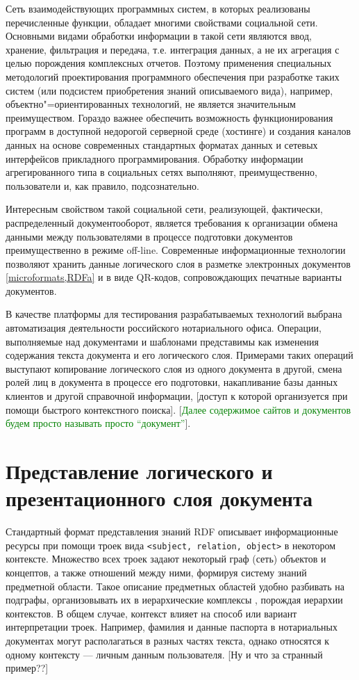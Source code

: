 \documentclass[utf8]{../IncArticle}
\newcommand{\e}[2][fcolor]{\textcolor{pcolor}{[}\textcolor{#1}{#2}\textcolor{pcolor}{]}}
\begin{document}
Сеть взаимодействующих программных систем, в которых реализованы
перечисленные функции, обладает многими свойствами социальной сети.
Основными видами обработки информации в такой сети являются ввод,
хранение, фильтрация и передача, т.е. интеграция данных, а не их
агрегация с целью порождения комплексных отчетов.  Поэтому применения
специальных методологий проектирования программного обеспечения при
разработке таких систем (или подсистем приобретения знаний
описываемого вида), например, объектно"=ориентированных технологий, не
является значительным преимуществом.  Гораздо важнее обеспечить
возможность функционирования программ в доступной недорогой серверной
среде (хостинге) и создания каналов данных на основе современных
стандартных форматах данных и сетевых интерфейсов прикладного
программирования.  Обработку информации агрегированного типа в
социальных сетях выполняют, преимущественно, пользователи и, как
правило, подсознательно.

Интересным свойством такой социальной сети, реализующей, фактически,
распределенный документооборот, является требования к организации
обмена данными между пользователями в процессе подготовки документов
преимущественно в режиме off-line.  Современные информационные
технологии позволяют хранить данные логического слоя в разметке
электронных документов \ref{microformats,RDFa} и в виде QR-кодов,
сопровождающих печатные варианты документов.

В качестве платформы для тестирования разрабатываемых технологий
выбрана автоматизация деятельности российского нотариального
офиса.  Операции, выполняемые над документами и шаблонами представимы
как изменения содержания текста документа и его логического
слоя.  Примерами таких операций выступают копирование логического слоя
из одного документа в другой, смена ролей лиц в документа в процессе
его подготовки, накапливание базы данных клиентов и другой справочной
информации, \e{доступ к которой организуется при помощи быстрого
контекстного поиска}. \e[green]{Далее содержимое сайтов и документов будем
просто называть просто ``документ''}.

\section{Представление логического и презентационного слоя документа}

Стандартный формат представления знаний RDF описывает информационные
ресурсы при помощи троек вида \texttt{<subject, relation, object>} в
некотором контексте.  Множество всех троек задают некоторый граф (сеть)
объектов и концептов, а также отношений между ними, формируя систему
знаний предметной области.  Такое описание предметных областей удобно
разбивать на подграфы, организовывать их в иерархические комплексы
\cite{b4}, порождая иерархии контекстов.  В общем случае, контекст
влияет на способ или вариант интерпретации троек.  Например, фамилия и
данные паспорта в нотариальных документах могут располагаться в разных
частях текста, однако относятся к одному контексту --- личным данным
пользователя.  \e{Ну и что за странный пример??}
\end{document}
